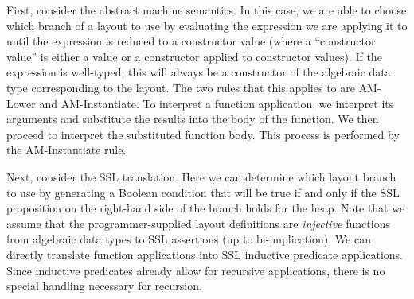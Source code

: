 First, consider the abstract machine semantics. In this case, we are able to choose which branch of a layout to use by evaluating the expression we are applying it
          to until the expression is reduced to a constructor value (where a ``constructor value'' is either a value or a constructor applied to constructor values). If the expression is well-typed, this will always be a constructor
          of the algebraic data type corresponding to the layout. The two rules that this applies to are {\sc AM-Lower} and
          {\sc AM-Instantiate}.
        To interpret a function application, we interpret its arguments and substitute the results into the body
          of the function. We then proceed to interpret the substituted function body. This process is performed by the {\sc AM-Instantiate} rule.

Next, consider the SSL translation. Here we can determine which layout branch to use by generating a Boolean condition that will be
          true if and only if the SSL proposition on the right-hand side of the branch holds for the heap. Note
          that we assume that the programmer-supplied layout definitions are \textit{injective} functions from
          algebraic data types to SSL assertions (up to bi-implication).
We can directly translate function applications into SSL inductive predicate applications. Since inductive predicates
          already allow for recursive applications, there is no special handling necessary for recursion.

%
%
%


